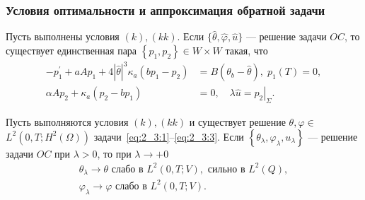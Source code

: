 \begin{frame}
    \frametitle{Условия оптимальности и аппроксимация обратной задачи}


    \begin{theorem}
        \label{th:2_3:2}
        Пусть выполнены условия $(k), (kk)$.
        Если $\{\widehat{\theta}, \widehat{\varphi}, \widehat{u}\}$ — решение задачи $OC$,
        то существует единственная пара $\left\{p_ {1}, p_{2}\right\} \in W \times W$ такая, что
        \begin{equation}
            \label{eq:2_3:15}
            \begin{aligned}
                -p_{1}^{\prime}+a A p_{1}+4|\widehat{\theta}|^{3} \kappa_{a}\left(b p_{1}
                -p_{2}\right)&=B\left(\theta_{b}-\widehat{\theta}\right), \;
                p_{1}(T)=0, \\
                \alpha A p_{2}+\kappa_{a}\left(p_{2}-b p_{1}\right)&=0,
                \quad \lambda \widehat{u}=\left.p_{2}\right|_{\Sigma}.
            \end{aligned}
        \end{equation}
    \end{theorem}

    \begin{theorem}
        \label{th:2_3:3}
        Пусть выполняются условия $(k), (kk)$ и существует решение
        $\theta, \varphi \in$ $L^{2}\left(0, T ; H^{2}(\Omega) \right)$
        задачи~\eqref{eq:2_3:1}--\eqref{eq:2_3:3}.
        Если $\left\{\theta_{\lambda}, \varphi_{\lambda}, u_{\lambda}\right\}$
        — решение задачи $OC$ при $\lambda>0$, то при $\lambda\rightarrow+0$
        \[
            \begin{gathered}
                \theta_{\lambda} \rightarrow \theta \text { слабо в } L^{2}(0, T ; V),
                \text { сильно в } L^{2}(Q), \\
                \varphi_{\lambda} \rightarrow \varphi \text { слабо в } L^{2}(0, T ; V).
            \end{gathered}
        \]
    \end{theorem}
\end{frame}

